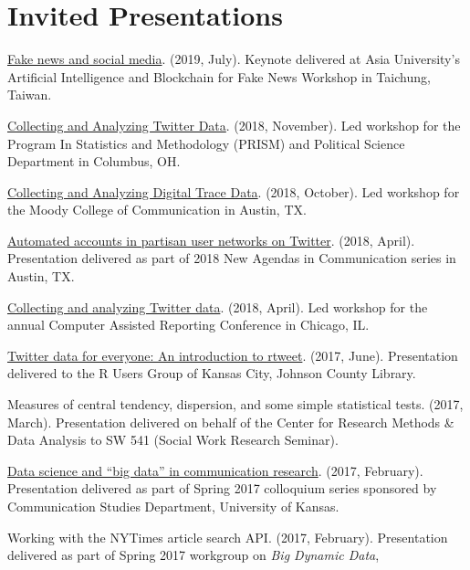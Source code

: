 \section{Invited Presentations}
  \begin{bibenum}
    \item[] \href{http://www.asia.edu.tw/en/news1_detail.php?no=268}{Fake news and social media}. (2019, July).
      Keynote delivered at Asia University's Artificial Intelligence and Blockchain for Fake News Workshop in Taichung, Taiwan.
    \item[] \href{https://rtweet-workshop.mikewk.com}{Collecting and Analyzing Twitter Data}. (2018, November).
      Led workshop for the Program In Statistics and Methodology (PRISM) and Political Science Department in Columbus, OH.
    \item[] \href{https://mkearney.github.io/moody_rstats}{Collecting and Analyzing Digital Trace Data}. (2018, October).
      Led workshop for the Moody College of Communication in Austin, TX.
    \item[] \href{https://mkearney.github.io/utchapter/presentation}{Automated accounts in partisan user networks on Twitter}. (2018, April).
      Presentation delivered as part of 2018 New Agendas in Communication series in Austin, TX.
    \item[] \href{https://mkearney.github.io/nicar_tworkshop}{Collecting and analyzing Twitter data}. (2018, April).
      Led workshop for the annual Computer Assisted Reporting Conference in Chicago, IL.
    \item[] \href{https://mkearney.github.io/rusersKC}{Twitter data for everyone: An introduction to rtweet}. (2017, June).
      Presentation delivered to the R Users Group of Kansas City, Johnson County Library.
    \item[] Measures of central tendency, dispersion, and some simple statistical tests. (2017, March).
      Presentation delivered on behalf of the Center for Research Methods \& Data Analysis to SW 541 (Social Work Research Seminar).
    \item[] \href{https://mkearney.github.io/COLLOQUIUM/slides.html}{Data science and ``big data'' in communication research}. (2017, February).
      Presentation delivered as part of Spring 2017 colloquium series sponsored by Communication Studies Department, University of Kansas.
    \item[] Working with the NYTimes article search API. (2017, February).
      Presentation delivered as part of Spring 2017 workgroup on \textit{Big Dynamic Data},

\end{bibenum}
